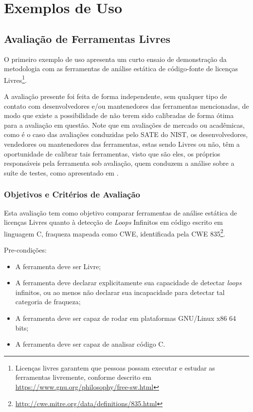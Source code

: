 \chapter{Exemplos de Uso}\label{exemplos_de_uso}

\section{Avaliação de Ferramentas Livres}

O primeiro exemplo de uso apresenta um curto ensaio de demonstração da metodologia com as ferramentas de análise estática de código-fonte de licenças Livres\footnote{Licenças livres garantem que pessoas possam executar e estudar as ferramentas livremente, conforme descrito em \url{https://www.gnu.org/philosophy/free-sw.html}}. 

A avaliação presente foi feita de forma independente, sem qualquer tipo de contato com desenvolvedores e/ou mantenedores das ferramentas mencionadas, de modo que existe a possibilidade de não terem sido calibradas de forma ótima para a avaliação em questão. Note que em avaliações de mercado ou acadêmicas, como é o caso das avaliações conduzidas pelo SATE do NIST, os desenvolvedores, vendedores ou mantenedores das ferramentas, estas sendo Livres ou não, têm a oportunidade de calibrar tais ferramentas, visto que são eles, os próprios responsáveis pela ferramenta sob avaliação, quem conduzem a análise sobre a suíte de testes, como apresentado em \cite{sate_iv}.

\subsection{Objetivos e Critérios de Avaliação}

Esta avaliação tem como objetivo comparar ferramentas de análise estática de licenças Livres quanto à detecção de \textit{Loops} Infinitos em código escrito em linguagem C, fraqueza mapeada como CWE, identificada pela CWE 835\footnote{\url{http://cwe.mitre.org/data/definitions/835.html}}.

Pre-condições:
\begin{itemize}
  \item A ferramenta deve ser Livre;
  \item A ferramenta deve declarar explicitamente sua capacidade de detectar \textit{loops} infinitos, ou ao menos não declarar sua incapacidade para detectar tal categoria de fraqueza;
  \item A ferramenta deve ser capaz de rodar em plataformas GNU/Linux x86 64 bits;
  \item A ferramenta deve ser capaz de analisar código C.
\end{itemize}

